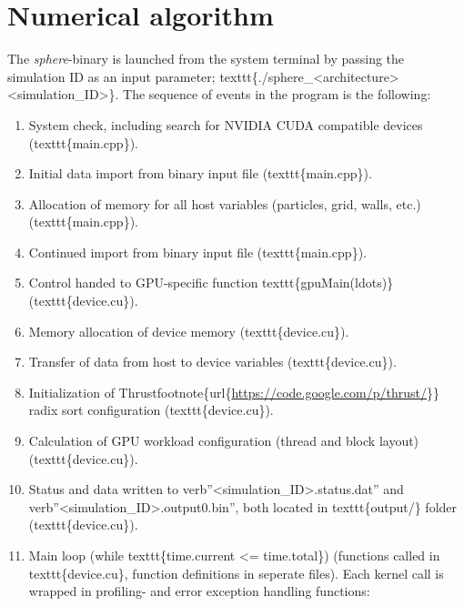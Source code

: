 \documentclass[letterpaper,10pt,english]{sphinxmanual}
\begin{document}
\section{Numerical algorithm}
\label{sphere_internals:numerical-algorithm}
The \emph{sphere}-binary is launched from the system terminal by passing the simulation ID as an input parameter; texttt\{./sphere\_\textless{}architecture\textgreater{} \textless{}simulation\_ID\textgreater{}\}. The sequence of events in the program is the following:
\begin{enumerate}
\item {} 
System check, including search for NVIDIA CUDA compatible devices (texttt\{main.cpp\}).

\item {} 
Initial data import from binary input file (texttt\{main.cpp\}).

\item {} 
Allocation of memory for all host variables (particles, grid, walls, etc.) (texttt\{main.cpp\}).

\item {} 
Continued import from binary input file (texttt\{main.cpp\}).

\item {} 
Control handed to GPU-specific function texttt\{gpuMain(ldots)\} (texttt\{device.cu\}).

\item {} 
Memory allocation of device memory (texttt\{device.cu\}).

\item {} 
Transfer of data from host to device variables (texttt\{device.cu\}).

\item {} 
Initialization of Thrustfootnote\{url\{\href{https://code.google.com/p/thrust/}{https://code.google.com/p/thrust/}\}\} radix sort configuration (texttt\{device.cu\}).

\item {} 
Calculation of GPU workload configuration (thread and block layout) (texttt\{device.cu\}).

\item {} 
Status and data written to verb''\textless{}simulation\_ID\textgreater{}.status.dat'' and verb''\textless{}simulation\_ID\textgreater{}.output0.bin'', both located in texttt\{output/\} folder (texttt\{device.cu\}).

\item {} 
Main loop (while texttt\{time.current \textless{}= time.total\}) (functions called in texttt\{device.cu\}, function definitions in seperate files). Each kernel call is wrapped in profiling- and error exception handling functions:

\end{enumerate}
\end{document}
